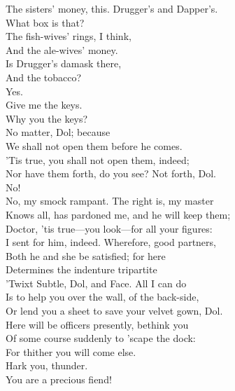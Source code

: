 \documentclass[a4paper,oneside,12pt]{memoir}
\begin{document}
\begin{drama*}
The sisters' money, this. Drugger's and Dapper's.\\
\facespeaks What box is that?\\
\subtlespeaks {} The fish-wives' rings, I think,\\
And the ale-wives' money.\\
\facespeaks {} Is Drugger's damask there,\\
And the tobacco?\\
\subtlespeaks {} Yes.\\
\facespeaks {} Give me the keys.\\
\dolspeaks Why you the keys?\\
\subtlespeaks {} No matter, Dol; because\\
We shall not open them before he comes.\\
\facespeaks 'Tis true, you shall not open them, indeed;\\
Nor have them forth, do you see? Not forth, Dol.\\
\dolspeaks No!\\
\facespeaks {} No, my smock rampant. The right is, my master\\
Knows all, has pardoned me, and he will keep them;\\
Doctor, 'tis true---you look---for all your figures:\\
I sent for him, indeed. Wherefore, good partners,\\
Both he and she be satisfied; for here\\
Determines the indenture tripartite\\
'Twixt Subtle, Dol, and Face. All I can do\\
Is to help you over the wall, of the back-side,\\
Or lend you a sheet to save your velvet gown, Dol.\\
Here will be officers presently, bethink you\\
Of some course suddenly to 'scape the dock:\\
For thither you will come else.\\
 Hark you, thunder.\\
\subtlespeaks You are a precious fiend!\\

\end{drama*}
\end{document}
